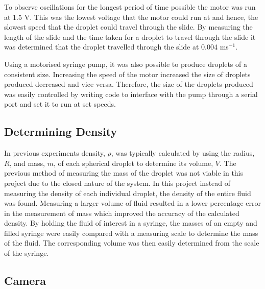 \documentclass{physics_article_B}
\begin{document}
        To observe oscillations for the longest period of time possible the motor was run at 1.5 V. This was the lowest voltage that the motor could run at and hence, the slowest speed that the droplet could travel through the slide. By measuring the length of the slide and the time taken for a droplet to travel through the slide it was determined that the droplet travelled through the slide at 0.004 ms$^{-1}$.  
        
        Using a motorised syringe pump, it was also possible to produce droplets of a consistent size. Increasing the speed of the motor increased the size of droplets produced decreased and vice versa. Therefore, the size of the droplets produced was easily controlled by writing code to interface with the pump through a serial port and set it to run at set speeds. 
        
        
    \subsection{Determining Density\label{sect:method:density}}
    
        In previous experiments density, $\rho$, was typically calculated by using the radius, $R$, and mass, $m$, of each spherical droplet to determine its volume, $V$. The previous method of measuring the mass of the droplet was not viable in this project due to the closed nature of the system. In this project instead of measuring the density of each individual droplet, the density of the entire fluid was found. Measuring a larger volume of fluid resulted in a lower percentage error in the measurement of mass which improved the accuracy of the calculated density. By holding the fluid of interest in a syringe, the masses of an empty and filled syringe were easily compared with a measuring scale to determine the mass of the fluid. The corresponding volume was then easily determined from the scale of the syringe. 
        
    \subsection{Camera\label{sect:method:vision}}
        
\end{document}
